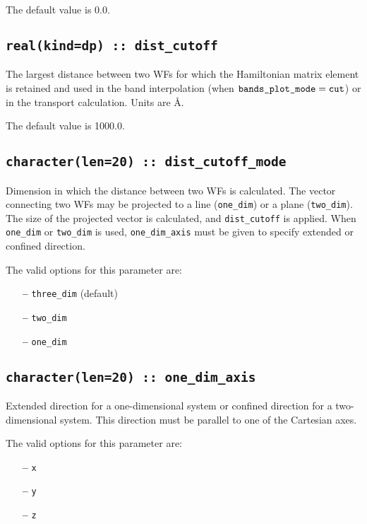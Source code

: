 The default value is 0.0.

\subsection[dist\_cutoff]{\tt real(kind=dp) :: dist\_cutoff}

The largest distance between two WFs for which
the Hamiltonian matrix element is retained and used in
the band interpolation (when $\verb#bands_plot_mode#=\verb#cut#$)
or in the transport calculation. Units are \AA. 

The default value is 1000.0.

\subsection[dist\_cutoff\_mode]{\tt character(len=20) :: dist\_cutoff\_mode}

Dimension in which the distance between two WFs is calculated.
The vector connecting two WFs may be projected
to a line (\verb#one_dim#) or a plane (\verb#two_dim#).
The size of the projected vector 
is calculated, and \verb#dist_cutoff# is applied.
When \verb#one_dim# or \verb#two_dim#
is used, \verb#one_dim_axis# must be given
to specify extended or confined direction.

The valid options for this parameter are:
\begin{itemize}
\item[{\bf --}] \verb#three_dim#  (default)
\item[{\bf --}] \verb#two_dim#  
\item[{\bf --}] \verb#one_dim# 
\end{itemize}

\subsection[one\_dim\_axis]{\tt character(len=20) :: one\_dim\_axis}

Extended direction for a one-dimensional system
or confined direction for a two-dimensional system.
This direction must be parallel to one of the Cartesian axes.

The valid options for this parameter are:
\begin{itemize}
\item[{\bf --}] \verb#x#
\item[{\bf --}] \verb#y#
\item[{\bf --}] \verb#z# 
\end{itemize}

